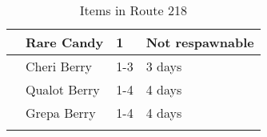 \begin{longtable}{|| l l l l ||}%
\hline%
&Rare Candy&1&Not respawnable\\%
\hline%
&Cheri Berry&1{-}3&3 days\\%
\hline%
&Qualot Berry&1{-}4&4 days\\%
\hline%
&Grepa Berry&1{-}4&4 days\\%
\hline%
\endhead%
\hline%
\caption{Items in Route 218}%
\label{tab:Route218Items}%
\end{longtable}